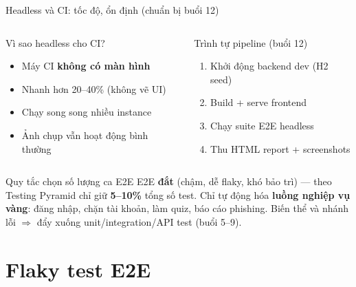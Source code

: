 \documentclass[aspectratio=169,12pt]{beamer}
\begin{document}
\begin{frame}{Headless và CI: tốc độ, ổn định (chuẩn bị buổi 12)}
  \begin{columns}[T]
    \begin{block}{Vì sao headless cho CI?}
      \begin{itemize}
        \item Máy CI \textbf{không có màn hình}
        \item Nhanh hơn 20--40\% (không vẽ UI)
        \item Chạy song song nhiều instance
        \item Ảnh chụp vẫn hoạt động bình thường
      \end{itemize}
    \end{block}

    \begin{block}{Trình tự pipeline (buổi 12)}
      \begin{enumerate}
        \item Khởi động backend dev (H2 seed)
        \item Build + serve frontend
        \item Chạy suite E2E headless
        \item Thu HTML report + screenshots
      \end{enumerate}
    \end{block}
  \end{columns}

  \vspace{0.3em}
  \begin{alertblock}{Quy tắc chọn số lượng ca E2E}
    E2E \textbf{đắt} (chậm, dễ flaky, khó bảo trì) --- theo Testing
    Pyramid chỉ giữ \textbf{5--10\%} tổng số test. Chỉ tự động hóa
    \textbf{luồng nghiệp vụ vàng}: đăng nhập, chặn tài khoản, làm quiz,
    báo cáo phishing. Biến thể và nhánh lỗi $\Rightarrow$ đẩy xuống
    unit/integration/API test (buổi 5--9).
  \end{alertblock}
\end{frame}

\section{Flaky test E2E}
\end{document}
